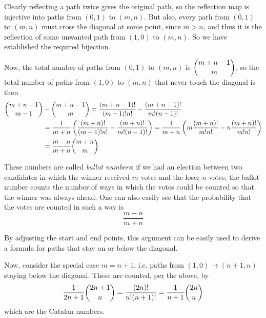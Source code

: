 \documentclass[12pt]{article}
\begin{document}
Clearly reflecting a path twice gives the original path, so the reflection map is injective into paths from $(0,1)$ to $(m,n)$. But also, every path from $(0,1)$ to $(m,n)$ must cross the diagonal at some point, since $m>n$, and thus it is the reflection of some unwanted path from $(1,0)$ to $(m,n)$. So we have established the required bijection.

Now, the total number of paths from $(0,1)$ to $(m,n)$ is $\dbinom{m+n-1}{m}$, so the total number of paths from $(1,0)$ to $(m,n)$ that never touch the diagonal is then
\begin{align*}\dbinom{m+n-1}{m-1}&-\dbinom{m+n-1}{m} = \frac{(m+n-1)!}{(m-1)!n!}-\frac{(m+n-1)!}{m!(n-1)!} \\
&=\frac{1}{m+n}\left(\frac{(m+n)!}{(m-1)!n!}-\frac{(m+n)!}{m!(n-1)!}\right)=\frac{1}{m+n}\left(m\frac{(m+n)!}{m!n!}-n\frac{(m+n)!}{m!n!}\right)\\
&=\frac{m-n}{m+n}\dbinom{m+n}{m}
\end{align*}

These numbers are called \emph{ballot numbers}: if we had an election between two candidates in which the winner received $m$ votes and the loser $n$ votes, the ballot number counts the number of ways in which the votes could be counted so that the winner was always ahead. One can also easily see that the probability that the votes are counted in such a way is
\[\frac{m-n}{m+n}\]

By adjusting the start and end points, this argument can be easily used to derive a formula for paths that stay on or below the diagonal.

Now, consider the special case $m=n+1$, i.e. paths from $(1,0)\to(n+1,n)$ staying below the diagonal. These are counted, per the above, by
\[\frac{1}{2n+1}\dbinom{2n+1}{n}=\frac{(2n)!}{n!(n+1)!}=\frac{1}{n+1}\dbinom{2n}{n}\]
which are the Catalan numbers.
\end{document}
